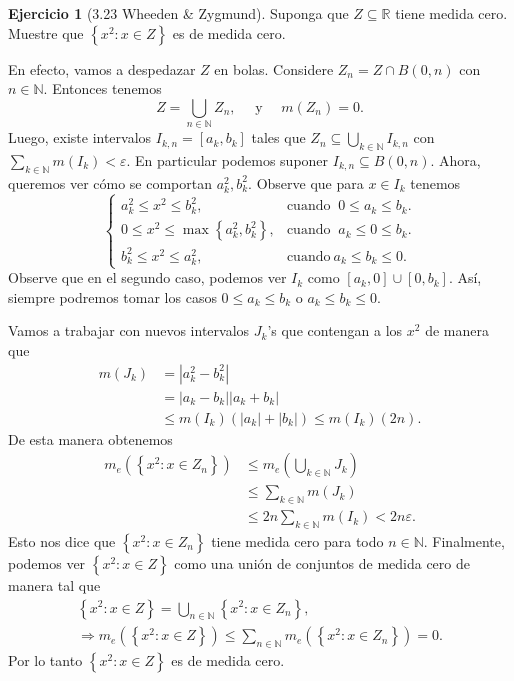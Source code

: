 \documentclass[12pt]{article}
\theoremstyle{plain}
\theoremstyle{definition}
\newtheorem{Ej}[Th]{Ejercicio}
\theoremstyle{remark}
\numberwithin{equation}{section}
\newcommand{\bN}{\mathbb{N}}        %
\newcommand{\bR}{\mathbb{R}}        %
\renewcommand{\leq}{\leqslant}      %
\renewcommand{\:}{\colon}           %
\newcommand{\conj}[1]{\left\lbrace#1\right\rbrace}
\newcommand{\bonj}[1]{\left\lbrack#1\right\rbrack}
\begin{document}
\begin{multicols}{2}
\begin{Ej}[3.23  Wheeden \& Zygmund]%
Suponga que $Z\subseteq\bR$ tiene medida cero. Muestre que $\conj{x^2\:x\in Z}$ es de medida cero.
\end{Ej}

\begin{ptcbp}
En efecto, vamos a despedazar $Z$ en bolas. Considere $Z_n=Z\cap B(0,n)$ con $n\in\bN$. Entonces tenemos
$$Z=\bigcup_{n\in\bN}Z_n,\quad\text{ y }\quad m(Z_n)=0.$$
Luego, existe intervalos $I_{k,n}=\bonj{a_k,b_k}$ tales que $Z_n\subseteq\bigcup_{k\in\bN}I_{k,n}$ con $\sum_{k\in\bN}m(I_k)<\varepsilon$. En particular podemos suponer $I_{k,n}\subseteq B(0,n)$. Ahora, queremos ver cómo se comportan $a_k^2, b_k^2$. Observe que para $x\in I_k$ tenemos
$$
\begin{cases}
  a_k^2\leq x^2\leq b_k^2, & \mbox{cuando }\ 0\leq a_k\leq b_k. \\
  0\leq x^2\leq\max\conj{a_k^2,b_k^2}, & \mbox{cuando }\ a_k\leq0\leq b_k. \\
  b_k^2\leq x^2\leq a_k^2, & \mbox{cuando}\ a_k\leq b_k\leq 0.
\end{cases}
$$
Observe que en el segundo caso, podemos ver $I_k$ como $\bonj{a_k,0}\cup\bonj{0,b_k}$. Así, siempre podremos tomar los casos $0\leq a_k\leq b_k$ o $a_k\leq b_k\leq 0$.\par
Vamos a trabajar con nuevos intervalos $J_k$'s que contengan a los $x^2$ de manera que
\begin{align*}
 m(J_k)&=|a_k^2-b_k^2|\\
 &=|a_k-b_k| |a_k+b_k|\\
 &\leq m(I_k)(|a_k|+|b_k|)\leq m(I_k)(2n).
\end{align*}
De esta manera obtenemos
\begin{align*}
  m_e(\conj{x^2\: x\in Z_n}) & \leq m_e\left(\bigcup_{k\in\bN}J_k\right)\\
  &\leq \sum_{k\in\bN}m(J_k)\\
  &\leq 2n\sum_{k\in\bN}m(I_k)<2n\varepsilon.
\end{align*}
Esto nos dice que $\conj{x^2\: x\in Z_n}$ tiene medida cero para todo $n\in\bN$. Finalmente, podemos ver $\conj{x^2\: x\in Z}$ como una unión de conjuntos de medida cero de manera tal que
\begin{gather*}
  \conj{x^2\: x\in Z}=\bigcup_{n\in\bN}\conj{x^2\: x\in Z_n},\\
  \Rightarrow m_e(\conj{x^2\: x\in Z})\leq\sum_{n\in\bN}m_e(\conj{x^2\: x\in Z_n})=0.
\end{gather*}
Por lo tanto $\conj{x^2\:x\in Z}$ es de medida cero.
\end{ptcbp}


\end{multicols}
\end{document}
